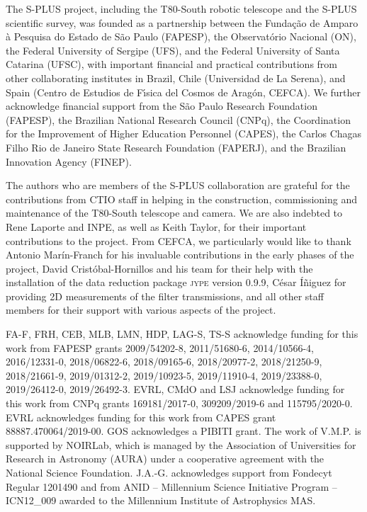 \documentclass[fleqn,usenatbib]{mnras}
\begin{document}
The S-PLUS project, including the T80-South robotic telescope and the S-PLUS scientific survey, was founded as a partnership between the Funda\c{c}\~{a}o de Amparo \`{a} Pesquisa do Estado de S\~{a}o Paulo (FAPESP), the Observat\'{o}rio Nacional (ON), the Federal University of Sergipe (UFS), and the Federal University of Santa Catarina (UFSC), with important financial and practical contributions from other collaborating institutes in Brazil, Chile (Universidad de La Serena), and Spain (Centro de Estudios de F\'{\i}sica del Cosmos de Arag\'{o}n, CEFCA). We further acknowledge financial support from the São Paulo Research Foundation (FAPESP), the Brazilian National Research Council (CNPq), the Coordination for the Improvement of Higher Education Personnel (CAPES), the Carlos Chagas Filho Rio de Janeiro State Research Foundation (FAPERJ), and the Brazilian Innovation Agency (FINEP).

The authors who are members of the S-PLUS collaboration are grateful for the contributions from CTIO staff in helping in the construction, commissioning and maintenance of the T80-South telescope and camera. We are also indebted to Rene Laporte and INPE, as well as Keith Taylor, for their important contributions to the project. From CEFCA, we particularly would like to thank Antonio Mar\'{i}n-Franch for his invaluable contributions in the early phases of the project, David Crist{\'o}bal-Hornillos and his team for their help with the installation of the data reduction package \textsc{jype} version 0.9.9, C\'{e}sar \'{I}\~{n}iguez for providing 2D measurements of the filter transmissions, and all other staff members for their support with various aspects of the project.

FA-F, FRH, CEB, MLB, LMN, HDP, LAG-S, TS-S acknowledge funding for this work from FAPESP grants 2009/54202-8, 2011/51680-6, 2014/10566-4, 2016/12331-0, 2018/06822-6, 2018/09165-6, 2018/20977-2, 2018/21250-9, 2018/21661-9, 2019/01312-2, 2019/10923-5, 2019/11910-4, 2019/23388-0, 2019/26412-0, 2019/26492-3. EVRL, CMdO and LSJ acknowledge funding for this work from CNPq grants 169181/2017-0, 309209/2019-6 and 115795/2020-0. EVRL acknowledges funding for this work from CAPES grant 88887.470064/2019-00. GOS acknowledges a PIBITI grant. The work of V.M.P. is supported by NOIRLab, which is managed by the Association of Universities for Research in Astronomy (AURA) under a cooperative agreement with the National Science Foundation. J.A.-G. acknowledges support from Fondecyt Regular 1201490 and from ANID – Millennium Science Initiative Program – ICN12\_009 awarded to the Millennium Institute of Astrophysics MAS.
\end{document}
